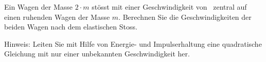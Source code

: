 Ein Wagen der Masse $2\cdot m$ stösst mit einer Geschwindigkeit von \vWaO\ zentral auf einen ruhenden Wagen der Masse $m$. Berechnen Sie die Geschwindigkeiten der beiden Wagen nach dem elastischen Stoss.

Hinweis: Leiten Sie mit Hilfe von Energie- und Impulserhaltung eine quadratische Gleichung mit nur einer unbekannten Geschwindigkeit her.
